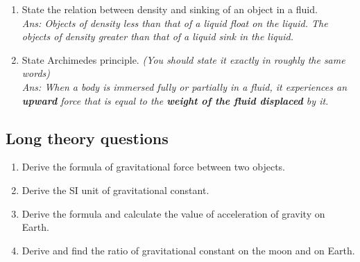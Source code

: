 \documentclass[12pt]{article}
\begin{document}
\begin{enumerate}
{			The mass per unit volume of a substance is called density.
		}
	\item State the relation between density and sinking of an object in a fluid. \\
		{\itshape Ans:
			Objects of density less than that of a liquid float
			on the liquid. The objects of density greater
			than that of a liquid sink in the liquid.
		}
	\item State Archimedes principle. {\itshape(You should state it exactly in roughly the same words)} \\
		{\itshape Ans:
			When a body is immersed fully or partially
			in a fluid, it experiences an \textbf{upward} force that
			is equal to the \textbf{weight of the fluid displaced}
			by it.
		}

\end{enumerate}

\subsection*{Long theory questions}
\begin{enumerate}
	\item Derive the formula of gravitational force between two objects.
	\item Derive the SI unit of gravitational constant.
	\item Derive the formula and calculate the value of acceleration of gravity on Earth.
	\item Derive and find the ratio of gravitational constant on the moon and on Earth.
\end{enumerate}
\end{document}

